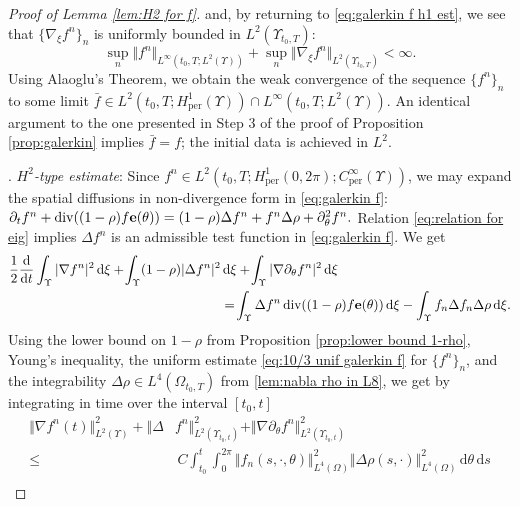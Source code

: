 \documentclass[11pt,a4paper,reqno]{amsart}
\theoremstyle{remark}
\theoremstyle{definition}
\numberwithin{equation}{section}
\newcommand{\per}{\mathrm{per}}
\DeclareMathOperator{\dv}{div}
\newcommand{\e}{{\bf e}}
\newcommand{\bxi}{\xi}
\renewcommand{\d}{\, \mathrm{d} }
\newcommand{\der}{\mathrm{d}}
\begin{document}
\begin{proof}[Proof of Lemma \ref{lem:H2 for f}]
 and, by returning to \eqref{eq:galerkin f h1 est}, we see that $\{\nabla_{\bxi}f^n \}_n$ is uniformly bounded in $L^2(\Upsilon_{t_0,T})$: 
 \begin{equation}\label{eq:10/3 unif galerkin f}
    \sup_n \Vert f^n \Vert_{L^\infty(t_0,T;L^2(\Upsilon))} + \sup_n \Vert \nabla_{\bxi}f^n \Vert_{L^2(\Upsilon_{t_0,T})} < \infty. 
 \end{equation}
 Using Alaoglu's Theorem, we obtain the weak convergence of the sequence $\{f^n\}_n$ to some limit $\bar{f} \in L^2(t_0,T;H^1_\per(\Upsilon)) \cap L^\infty(t_0,T;L^2(\Upsilon))$. An identical argument to the one presented in Step 3 of the proof of Proposition \ref{prop:galerkin} implies $\bar{f}=f$; the initial data is achieved in $L^2$. 

 \smallskip 

 . \textit{$H^2$-type estimate}: Since $f^n \in L^2(t_0,T;H^1_\per(0,2\pi);C^\infty_\per(\Upsilon))$, we may expand the spatial diffusions in non-divergence form in \eqref{eq:galerkin f}: $\partial_t f^n + \dv((1-\rho)f \e(\theta)) = (1-\rho)\Delta f^n + f^n \Delta \rho + \partial^2_\theta f^n.$ Relation \eqref{eq:relation for eig} implies $\Delta f^n$ is an admissible test function in \eqref{eq:galerkin f}. We get 
 \begin{equation*}
     \begin{aligned}
         \frac{1}{2}\frac{\der}{\der t}\int_\Upsilon |\nabla f^n |^2 \d \bxi +\! \int_\Upsilon (1-\rho)|\Delta f^n|^2 & \d \bxi + \!\int_\Upsilon |\nabla \partial_\theta f^n |^2 \d \bxi \\
         &= \!\int_\Upsilon \Delta f^n \dv((1-\rho)f \e(\theta)) \d \bxi - \int_\Upsilon f_n \Delta f_n \Delta \rho \d \bxi. 
     \end{aligned}
 \end{equation*}
Using the lower bound on $1-\rho$ from Proposition \ref{prop:lower bound 1-rho}, Young's inequality, the uniform estimate \eqref{eq:10/3 unif galerkin f} for $\{f^n\}_n$, and the integrability $\Delta \rho \in L^4(\Omega_{t_0,T})$  from \eqref{lem:nabla rho in L8}, we get by integrating in time  over the interval $[t_0,t]$ 
 \begin{equation}\label{eq:H2 for f step i}
     \begin{aligned}
        \Vert\nabla f^n(t) \Vert_{L^2(\Upsilon)}^2 +\! \Vert\Delta & f^n\Vert_{L^2(\Upsilon_{t_0,t})}^2 + \Vert\nabla \partial_\theta f^n \Vert_{L^2(\Upsilon_{t_0,t})}^2 \\
         \leq & \, C \int_{t_0}^t \int_0^{2\pi} \Vert f_n(s,\cdot,\theta) \Vert_{L^{4}(\Omega)}^2 \Vert \Delta \rho(s,\cdot) \Vert_{L^4(\Omega)}^2 \d\theta \d s \\ 

\end{aligned}
\end{equation}
\end{proof}
\end{document}
